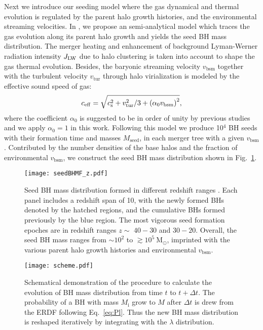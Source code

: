 \documentclass[nolinenumbers,preprint2,tighten]{aastex631}
\newcommand{\Msun}{\mathrm{M_\odot}}
\newcommand{\vbsm}{v_\mathrm{bsm}}
\newcommand{\jlw}{J_{\rm LW}}
\begin{document}
\begin{CJK*}{UTF8}{gbsn}
Next we introduce our seeding model where the gas dynamical and thermal evolution is regulated by the parent halo growth histories, 
and the environmental streaming velocities.
In \citet{2021ApJ...917...60L}, we propose an semi-analytical model which 
traces the gas evolution along its parent halo growth and yields the seed BH mass distribution. 
The merger heating and enhancement of background Lyman-Werner radiation intensity $\jlw$ 
due to halo clustering is taken into account to shape the gas thermal evolution. 
Besides, the baryonic streaming velocity $\vbsm$ together with the turbulent velocity $v_\mathrm{tur}$ 
through halo virialization is modeled by the effective sound speed of gas:
\begin{equation}
  c_{\rm eff} = \sqrt{ c_{\rm s}^2+v_{\rm tur}^2/3+\left(\alpha_0 \vbsm \right)^2}, 
\end{equation}
where the coefficient $\alpha_0$ is suggested to be in order of unity by previous studies 
\citep{2017Sci...357.1375H,2019MNRAS.484.3510S} 
and we apply $\alpha_0 = 1$ in this work. 
Following this model we produce 10$^4$ BH seeds with their formation time and masses $M_\mathrm{seed}$, 
in each merger tree with a given $\vbsm$. 
Contributed by the number densities of the base halos and the fraction of environmental $\vbsm$, 
we construct the seed BH mass distribution shown in Fig.~\ref{fig:seedmf}.

\begin{figure}
\centering
\texttt{[image: seedBHMF\_z.pdf]}
\caption{
Seed BH mass distribution formed in different redshift ranges . 
Each panel includes a redshift span of 10, 
with the newly formed BHs denoted by the hatched regions, 
and the cumulative BHs formed previously by the blue region.
The most vigorous seed formation epoches are in redshift ranges $z\sim$ $40-30$ and $30-20$.
Overall, the seed BH mass ranges from $\sim 10^2$ to $\gtrsim 10^5~\Msun$, 
imprinted with the various parent halo growth histories and environmental $\vbsm$. 
}
\label{fig:seedmf}
\end{figure}

\begin{figure*}
\centering
\texttt{[image: scheme.pdf]}
\caption{
Schematical demonstration of the procedure to calculate the evolution of BH mass distribution 
from time $t$ to $t+\Delta t$. 
The probability of a BH with mass $M_\mathrm{i}$ grow to $M$ after $\Delta t$ is drew from the 
ERDF following Eq.~\ref{eq:Pl}. 
Thus the new BH mass distribution is reshaped iteratively by integrating with the $\lambda$ distribution. 
}
\label{fig:scheme}
\end{figure*}


\end{CJK*}
\end{document}
